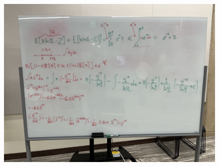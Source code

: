 \begin{figure}[h]
    \centering
    \includegraphics[width=1\textwidth]{figures/bounds-2.jpeg}
\end{figure}
